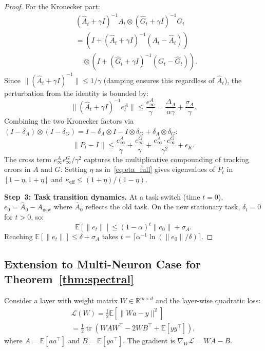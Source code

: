 \documentclass{article}
\providecommand{\R}{\mathbb{R}}
\providecommand{\E}{\mathbb{E}}
\providecommand{\norm}[1]{\lVert #1 \rVert}
\DeclareMathOperator{\tr}{tr}
\theoremstyle{plain}
\theoremstyle{definition}
\theoremstyle{remark}
\begin{document}
\begin{proof}
For the Kronecker part:
\begin{align}
    &(\hat{A}_t + \gamma I)^{-1}A_t \otimes (\hat{G}_t + \gamma I)^{-1}G_t \nonumber \\
    &= (I + (\hat{A}_t + \gamma I)^{-1}(A_t - \hat{A}_t)) \nonumber \\
    &\quad \otimes (I + (\hat{G}_t + \gamma I)^{-1}(G_t - \hat{G}_t)).
\end{align}
Since $\norm{(\hat{A}_t + \gamma I)^{-1}} \leq 1/\gamma$ (damping ensures this regardless of $\hat{A}_t$), the perturbation from the identity is bounded by:
\begin{equation}
    \norm{(\hat{A}_t + \gamma I)^{-1}e_t^A} \leq \frac{e_\infty^A}{\gamma} = \frac{\Delta_A}{\alpha\gamma} + \frac{\sigma_A}{\gamma}.
\end{equation}
Combining the two Kronecker factors via $(I - \delta_A) \otimes (I - \delta_G) = I - \delta_A \otimes I - I \otimes \delta_G + \delta_A \otimes \delta_G$:
\begin{equation}
    \norm{P_t - I} \leq \frac{e_\infty^A}{\gamma} + \frac{e_\infty^G}{\gamma} + \frac{e_\infty^A \cdot e_\infty^G}{\gamma^2} + \epsilon_K.
\end{equation}
The cross term $e_\infty^A e_\infty^G/\gamma^2$ captures the multiplicative compounding of tracking errors in $A$ and $G$. Setting $\eta$ as in~\eqref{eq:eta_full} gives eigenvalues of $P_t$ in $[1-\eta, 1+\eta]$ and $\kappa_{\mathrm{eff}} \leq (1+\eta)/(1-\eta)$.

\textbf{Step~3: Task transition dynamics.}
At a task switch (time $t=0$), $e_0 = \hat{A}_0 - A_{\mathrm{new}}$ where $\hat{A}_0$ reflects the old task. On the new stationary task, $\delta_t = 0$ for $t > 0$, so:
\begin{equation}
    \E[\norm{e_t}] \leq (1-\alpha)^t\norm{e_0} + \sigma_A.
\end{equation}
Reaching $\E[\norm{e_t}] \leq \delta + \sigma_A$ takes $t = \lceil\alpha^{-1}\ln(\norm{e_0}/\delta)\rceil$.
\end{proof}

\subsection{Extension to Multi-Neuron Case for Theorem~\ref{thm:spectral}}

Consider a layer with weight matrix $W \in \R^{m \times d}$ and the layer-wise quadratic loss:
\begin{multline}
    \mathcal{L}(W) = \frac{1}{2}\E\left[\norm{Wa - y}^2\right] \\
    = \frac{1}{2}\tr\!\left(W A W^\top - 2 W B^\top + \E[yy^\top]\right),
\end{multline}
where $A = \E[aa^\top]$ and $B = \E[ya^\top]$. The gradient is $\nabla_W \mathcal{L} = WA - B$.
\end{document}
